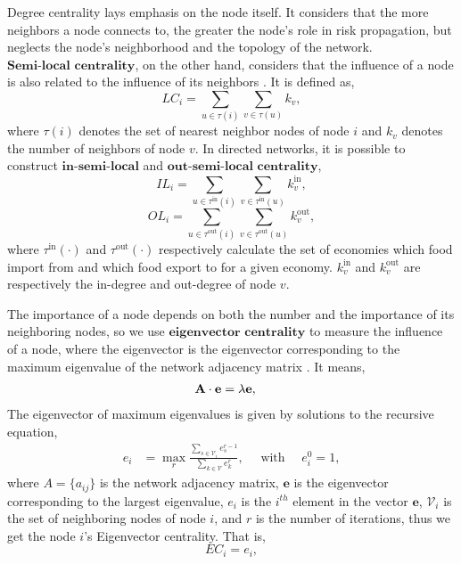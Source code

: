 \documentclass[preprint,3p,times,sort&compress]{elsarticle}
\begin{document}
Degree centrality lays emphasis on the node itself. It considers that the more neighbors a node connects to, the greater the node's role in risk propagation, but neglects the node's neighborhood and the topology of the network. $\textbf{Semi-local centrality}$, on the other hand, considers that the influence of a node is also related to the influence of its neighbors \cite{Chen-Lu-Shang-Zhang-Zhou-2012-PhysicaA}. It is defined as,
\begin{equation}
    LC_i=\sum_{u \in \tau(i)} \sum_ {v \in \tau(u)} k_v,
    \label{Eq:centrality:Semi_local}
\end{equation}
where $\tau(i)$ denotes the set of nearest neighbor nodes of node $i$ and $k_v$ denotes the number of neighbors of node $v$. In directed networks, it is possible to construct $\textbf{in-semi-local}$ and $\textbf{out-semi-local centrality}$, 
\begin{equation}
    IL_i=\sum_{u \in \tau^{\mathrm{in}}(i)} \sum_ {v \in \tau^{\mathrm{in}}(u)}k_v^{\mathrm{in}},
    \label{Eq:centrality:Semi_local:in}
\end{equation}
\begin{equation}
    OL_i=\sum_{u \in \tau^{\mathrm{out}} (i)} \sum_ {v \in \tau^{\mathrm{out}}(u)}k_v^{\mathrm{out}},
    \label{Eq:centrality:Semi_local:out}
\end{equation}
where $\tau^{\mathrm{in}}(\cdot)$ and $\tau^{\mathrm{out}} (\cdot)$ respectively calculate the set of economies which food import from and which food export to for a given economy. $k_v^{\mathrm{in}}$ and $k_v^{\mathrm{out}}$ are respectively the in-degree and out-degree of node $v$.

The importance of a node depends on both the number and the importance of its neighboring nodes, so we use $\textbf{eigenvector centrality}$ to measure the influence of a node, where the eigenvector is the eigenvector corresponding to the maximum eigenvalue of the network adjacency matrix \cite{Oehlers-Fabian-2021-Mathematics}. It means,
\begin{equation}
\begin{aligned}
\centering
\mathbf{A} \cdot \mathbf{e} &=\lambda \mathbf{e},
\end{aligned}
\label{Eq:eigenvector}
\end{equation}
The eigenvector of maximum eigenvalues is given by solutions to the recursive equation,
\begin{equation}
\begin{aligned}
e_i &=\max _{r} \frac{\sum_{s \in \mathscr{V}_{i}} e_{s}^{r-1}}{\sum_{k \in \mathscr{V}} e_{k}^{r}}, \quad \text { with } \quad e_{i}^{0}=1,
\label{Eq:final:eigenvector}
\end{aligned}
\end{equation}
where $A=\{a_{ij}\}$ is the network adjacency matrix, $\mathbf{e}$ is the eigenvector corresponding to the largest eigenvalue, $e_{i}$ is the $i^{th}$ element in the vector $\mathbf{e}$, $\mathscr{V}_{i}$ is the set of neighboring nodes of node $i$, and $r$ is the number of iterations, thus we get the node $i$'s Eigenvector centrality. That is,
\begin{equation}
EC_i=e_i,
\label{Eq:Centrality:Eigenvector}
\end{equation}
\end{document}
